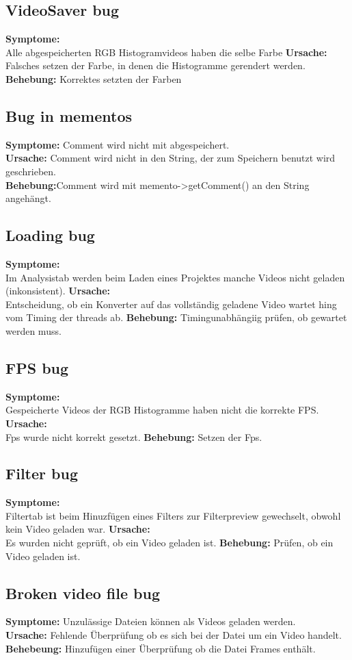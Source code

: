 \documentclass{scrartcl}
\begin{document}
{\subsection{VideoSaver bug}
\textbf{Symptome:}\\
Alle abgespeicherten RGB Histogramvideos haben die selbe Farbe
\textbf{Ursache:}\\
Falsches setzen der Farbe, in denen die Histogramme gerendert werden.
\textbf{Behebung:}
Korrektes setzten der Farben
\subsection{Bug in mementos}
\textbf{Symptome:} Comment wird nicht mit abgespeichert.\\
\textbf{Ursache:} Comment wird nicht in den String, der zum Speichern benutzt wird geschrieben.\\
\textbf{Behebung:}Comment wird mit memento->getComment() an den String angehängt.
\subsection{Loading bug}
\textbf{Symptome:}\\
Im Analysistab werden beim Laden eines Projektes manche Videos nicht geladen (inkonsistent).
\textbf{Ursache:}\\
Entscheidung, ob ein Konverter auf das vollständig geladene Video wartet hing vom Timing der threads ab.
\textbf{Behebung:}
Timingunabhängiig prüfen, ob gewartet werden muss.
\subsection{FPS bug}
\textbf{Symptome:}\\
Gespeicherte Videos der RGB Histogramme haben nicht die korrekte FPS.
\textbf{Ursache:}\\
Fps wurde nicht korrekt gesetzt.
\textbf{Behebung:}
Setzen der Fps.
\subsection{Filter bug}
\textbf{Symptome:}\\
Filtertab ist beim Hinuzfügen eines Filters zur Filterpreview gewechselt, obwohl kein Video geladen war.
\textbf{Ursache:}\\
Es wurden nicht geprüft, ob ein Video geladen ist.
\textbf{Behebung:}
Prüfen, ob ein Video geladen ist.
\subsection{Broken video file bug}
\textbf{Symptome:} Unzulässige Dateien können als Videos geladen werden.\\
\textbf{Ursache:} Fehlende Überprüfung ob es sich bei der Datei um ein Video handelt.\\
\textbf{Behebeung:} Hinzufügen einer Überprüfung ob die Datei Frames enthält.
}
\end{document}
